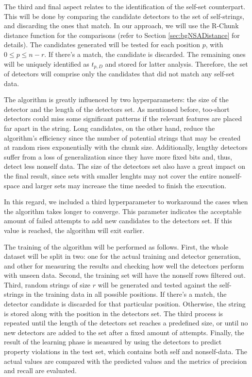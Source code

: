 The third and final aspect relates to the identification of the self-set counterpart. This will be done by comparing the candidate detectors to the set of self-strings, and discarding the ones that match. In our approach, we will use the R-Chunk distance function for the comparisons (refer to Section \ref{sec:bgNSADistance} for details). The candidates generated will be tested for each position \(p\), with \(0 \leq p \leq n-r\). If there's a match, the candidate is discarded. The remaining ones will be uniquely identified as \(t_{p, D}\) and stored for latter analysis. Therefore, the set of detectors will comprise only the candidates that did not match any self-set data.

The algorithm is greatly influenced by two hyperparameters: the size of the detector and the length of the detectors set. As mentioned before, too-short detectors could miss some significant patterns if the relevant features are placed far apart in the string. Long candidates, on the other hand, reduce the algorithm's efficiency since the number of potential strings that may be created at random rises exponentially with the chunk size. Additionally, lengthy detectors suffer from a loss of generalization since they have more fixed bits and, thus, detect less nonself data. The size of the detectors set also have a great impact on the final result, since sets with smaller lenghts may not cover the entire nonself-space and larger sets may increase the time needed to finish the execution. 

In this regard, we included a third hyperparameter to workaround the cases when the algorithm takes longer to converge. This parameter indicates the acceptable amount of failed attempts to add new candidates to the detectors set. If this value is reached, the algorithm will exit earlier.

The training of the algorithm will be performed as follows. First, the whole dataset will be split in two: one for the actual training and detector generation, and other for measuring the results and checking how well the detectors perform with unseen data. Second, the training set will have the nonself rows filtered out. Third, random strings of size \(r\) will be generated and tested against the self-strings in the training data in all possible positions. If there's a match, the detector candidate is discarded for that particular position. Otherwise, the string is stored along with the position in the detectors set. The third process is repeated until the length of the detectors set reaches a predefined size, or until no new detectors are added to the set after a fixed amount of attempts. Finally, the result of the learning phase is measured by using the detectors to predict property violations in the test set, which contains both self and nonself-data. The actual values are compared with the predicted values and the metrics of precision and recall are evaluated.

